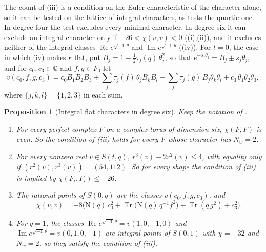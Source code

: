 \documentclass[11pt,reqno]{amsart}
\theoremstyle{plain}
\newtheorem{proposition}[theorem]{Proposition}
\theoremstyle{definition}
\theoremstyle{remark}
\newcommand{\QQ}{\mathbb{Q}}
\newcommand{\Nm}{\mathrm{N}}             %
\DeclareMathOperator{\Tr}{Tr}
\begin{document}
The count of (iii) is a condition on the Euler
characteristic of the character alone, so it can be tested on the lattice of
integral characters, as  tests the quartic one. In
degree four the test excludes every minimal character. In degree six it can
exclude an integral character only if $-26<\chi(v,v)<0$
((i),(ii)), and it excludes neither of the integral
classes $\operatorname{Re}e^{\sqrt{-1}\,\theta}$ and
$\operatorname{Im}e^{\sqrt{-1}\,\theta}$ ((iv)). For
$t=0$, the case in which
(iv) makes $\kappa$ flat, put
$B_{j}=1-\tfrac12\tau_{j}(q)\,\theta_{j}^{2}$, so that
$e^{\pm s_{j}\theta_{j}}=B_{j}\pm s_{j}\theta_{j}$, and for
$c_{0},c_{3}\in\QQ$ and $f,g\in F_{0}$ let
\[
  v(c_{0},f,g,c_{3})=c_{0}B_{1}B_{2}B_{3}
  +\sum_{j}\tau_{j}(f)\,\theta_{j}B_{k}B_{l}
  +\sum_{j}\tau_{j}(g)\,B_{j}\theta_{k}\theta_{l}
  +c_{3}\,\theta_{1}\theta_{2}\theta_{3},
\]
where $\{j,k,l\}=\{1,2,3\}$ in each sum.

\begin{proposition}[Integral flat characters in degree six]
\label{prop:sexticintegral}
Keep the notation of .
\begin{enumerate}[label=\textup{(\roman*)},leftmargin=2.6em,itemsep=2pt]
\item For every perfect complex $F$ on a complex torus of dimension six,
  $\chi(F,F)$ is even. So the condition of (iii)
  holds for every $F$ whose character has $N_{w}=2$.
\item For every nonzero real $v\in S(t,q)$, $r^{3}(v)-2r^{2}(v)\le4$, with
  equality only if $(r^{2}(v),r^{3}(v))=(54,112)$. So for every shape the
  condition of (iii) is implied by
  $\chi(F_{i},F_{i})\le-26$.
\item The rational points of $S(0,q)$ are the classes $v(c_{0},f,g,c_{3})$,
  and
  \[
    \chi(v,v)=-8\bigl(\Nm(q)\,c_{0}^{2}+\Tr\bigl(\Nm(q)\,q^{-1}f^{2}\bigr)
    +\Tr(q\,g^{2})+c_{3}^{2}\bigr).
  \]
\item For $q=1$, the classes $\operatorname{Re}e^{\sqrt{-1}\,\theta}=v(1,0,-1,0)$
  and $\operatorname{Im}e^{\sqrt{-1}\,\theta}=v(0,1,0,-1)$ are integral
  points of $S(0,1)$ with $\chi=-32$ and $N_{w}=2$, so they satisfy the
  condition of (iii).
\end{enumerate}
\end{proposition}
\end{document}
